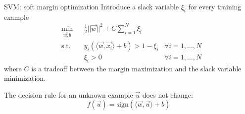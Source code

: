 \begin{frame}{SVM: soft margin optimization}
Introduce a slack variable $\xi_i$ for every training example
\begin{equation*}
\begin{aligned}
& \min_{\vec{w},b} & & \frac{1}{2}||\vec{w}||^2 + C\sum_{i=1}^N\xi_i\\
&\text{s.t.} & & y_i(\langle\vec{w},\vec{x_i}\rangle + b)>1-\xi_i & \forall i=1,\ldots,N\\
& & & \xi_i > 0 & \forall i=1,\ldots,N
\end{aligned}
\end{equation*}
where $C$ is a tradeoff between the margin maximization and the slack variable minimization.

The decision rule for an unknown example $\vec{u}$ does not change:
\begin{equation*}
f(\vec{u}) = \text{sign}(\langle\vec{w},\vec{u}\rangle + b)
\end{equation*}


\end{frame}